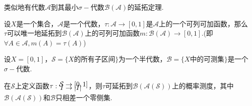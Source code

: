 \documentclass[lang=cn,a4paper,11pt,openany,scheme=chinese,twoside]{elegantbook}
\newcommand{\sigmaalg}{\sigma-\text{代数}}
\newcommand{\setjot}[1][0]{\setlength{\jot}{#1 pt}}
\begin{document}
类似地有代数$\mathcal{A}$到其最小$\sigmaalg\mathcal{B}(\mathcal{A})$的延拓定理.
\begin{theorem}
    设$X$是一个集合，$\mathcal{A}$是一个代数，$\tau:\mathcal{A}\to[0,1]$是$\mathcal{A}$上的一个可列可加函数，那么$\tau$可以唯一地延拓到$\mathcal{B}(\mathcal{A})$上的可列可加函数$m:\mathcal{B}(\mathcal{A})\to[0,1]$.(即$\forall A\in\mathcal{A},m(A)=\tau(A)$)
\end{theorem}
\begin{instance}
    设$X=[0,1]$，$\mathcal{S}=\{X\text{的所有子区间}\}$为一个半代数，$\mathcal{B}=\{X\text{中的可测集}\}$是一个$\sigmaalg$.\par
    在$\mathcal{S}$上定义函数$\tau:{\setjot[-7]\begin{aligned}
        \mathcal{S}&\to[0,1]\\
        I&\to|I|
    \end{aligned}}$，则$\tau$可延拓到$\mathcal{B}\left(\mathcal{A}(\mathcal{S})\right)$上的概率测度，其中$\mathcal{B}\left(\mathcal{A}(\mathcal{S})\right)$和$\mathcal{B}$只相差一个零侧集.
\end{instance}
\end{document}
